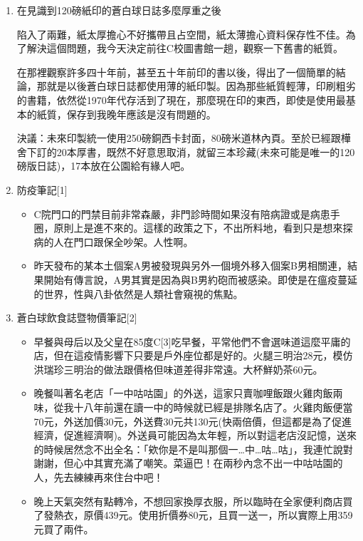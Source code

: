 \documentclass[a5paper, 12pt
]{book}
\begin{document}
\begin{enumerate}
\def\labelenumi{\arabic{enumi}.}
\item
  在見識到120磅紙印的蒼白球日誌多麼厚重之後

  陷入了兩難，紙太厚擔心不好攜帶且占空間，紙太薄擔心資料保存性不佳。為了解決這個問題，我今天決定前往C校圖書館一趟，觀察一下舊書的紙質。

  在那裡觀察許多四十年前，甚至五十年前印的書以後，得出了一個簡單的結論，那就是以後蒼白球日誌都使用薄的紙印製。因為那些紙質輕薄，印刷粗劣的書籍，依然從1970年代存活到了現在，那麼現在印的東西，即使是使用最基本的紙質，保存到我晚年應該是沒有問題的。

  決議：未來印製統一使用250磅銅西卡封面，80磅米道林內頁。至於已經跟樺舍下訂的20本厚書，既然不好意思取消，就留三本珍藏(未來可能是唯一的120磅版日誌)，17本放在公園給有緣人吧。
\item
  防疫筆記{[}1{]}

  \begin{itemize}
  \item
    C院門口的門禁目前非常森嚴，非門診時間如果沒有陪病證或是病患手圈，原則上是進不來的。這樣的政策之下，不出所料地，看到只是想來探病的人在門口跟保全吵架。人性啊。
  \item
    昨天發布的某本土個案A男被發現與另外一個境外移入個案B男相關連，結果開始有傳言說，A男其實是因為與B男約砲而被感染。即使是在瘟疫蔓延的世界，性與八卦依然是人類社會窺視的焦點。
  \end{itemize}
\item
  蒼白球飲食誌暨物價筆記{[}2{]}

  \begin{itemize}
  \item
    早餐與母后以及父皇在85度C{[}3{]}吃早餐，平常他們不會選味道這麼平庸的店，但在這疫情影響下只要是戶外座位都是好的。火腿三明治28元，模仿洪瑞珍三明治的做法跟價格但味道差得非常遠。大杯鮮奶茶60元。
  \item
    晚餐叫著名老店「一中咕咕園」的外送，這家只賣咖哩飯跟火雞肉飯兩味，從我十八年前還在讀一中的時候就已經是排隊名店了。火雞肉飯便當70元，外送加價30元，外送費30元共130元(快兩倍價，但這都是為了促進經濟，促進經濟啊)。外送員可能因為太年輕，所以對這老店沒記憶，送來的時候居然念不出全名：「欸你是不是叫那個一\ldots 中\ldots 咕\ldots 咕」，我連忙說對謝謝，但心中其實充滿了嘲笑。菜逼巴！在兩秒內念不出一中咕咕園的人，先去練練再來住台中吧！
  \item
    晚上天氣突然有點轉冷，不想回家換厚衣服，所以臨時在全家便利商店買了發熱衣，原價439元。使用折價券80元，且買一送一，所以實際上用359元買了兩件。
  \end{itemize}
\end{enumerate}
\end{document}
